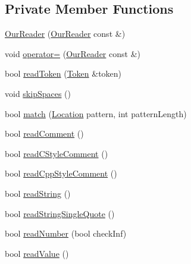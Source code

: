 \subsection*{Private Member Functions}
\begin{DoxyCompactItemize}
\item 
\hyperlink{classJson_1_1OurReader_aee013005522c0d34d2e14962851487ac_aee013005522c0d34d2e14962851487ac}{Our\+Reader} (\hyperlink{classJson_1_1OurReader}{Our\+Reader} const \&)
\item 
void \hyperlink{classJson_1_1OurReader_ad418de7c47bd3d0510888e22110b796e_ad418de7c47bd3d0510888e22110b796e}{operator=} (\hyperlink{classJson_1_1OurReader}{Our\+Reader} const \&)
\item 
bool \hyperlink{classJson_1_1OurReader_a0d1e66da47fe2e85f5033c59326dfdc3_a0d1e66da47fe2e85f5033c59326dfdc3}{read\+Token} (\hyperlink{classJson_1_1OurReader_1_1Token}{Token} \&token)
\item 
void \hyperlink{classJson_1_1OurReader_a6fbc6d58a4505e5ccadf330b57b17ca5_a6fbc6d58a4505e5ccadf330b57b17ca5}{skip\+Spaces} ()
\item 
bool \hyperlink{classJson_1_1OurReader_a4a03f1b266def9b47c4fef35386557fb_a4a03f1b266def9b47c4fef35386557fb}{match} (\hyperlink{classJson_1_1OurReader_a1bdc7bbc52ba87cae6b19746f2ee0189_a1bdc7bbc52ba87cae6b19746f2ee0189}{Location} pattern, int pattern\+Length)
\item 
bool \hyperlink{classJson_1_1OurReader_a90f6bb9e55b2bc3d6c1880809495c222_a90f6bb9e55b2bc3d6c1880809495c222}{read\+Comment} ()
\item 
bool \hyperlink{classJson_1_1OurReader_aba784b125baa1b62387e767b791f2f89_aba784b125baa1b62387e767b791f2f89}{read\+C\+Style\+Comment} ()
\item 
bool \hyperlink{classJson_1_1OurReader_ae3de80671f0f997053e1c1c8a47a45c5_ae3de80671f0f997053e1c1c8a47a45c5}{read\+Cpp\+Style\+Comment} ()
\item 
bool \hyperlink{classJson_1_1OurReader_a5d39b12671499ec5975f3bbc84b7d438_a5d39b12671499ec5975f3bbc84b7d438}{read\+String} ()
\item 
bool \hyperlink{classJson_1_1OurReader_ac78592defdc333faf56c6d0908758da3_ac78592defdc333faf56c6d0908758da3}{read\+String\+Single\+Quote} ()
\item 
bool \hyperlink{classJson_1_1OurReader_aefcb9a78cc45870ccac2db2a66c8ec50_aefcb9a78cc45870ccac2db2a66c8ec50}{read\+Number} (bool check\+Inf)
\item 
bool \hyperlink{classJson_1_1OurReader_a1765d9670d191c89a57a22ea5591d35f_a1765d9670d191c89a57a22ea5591d35f}{read\+Value} ()

\end{DoxyCompactItemize}
